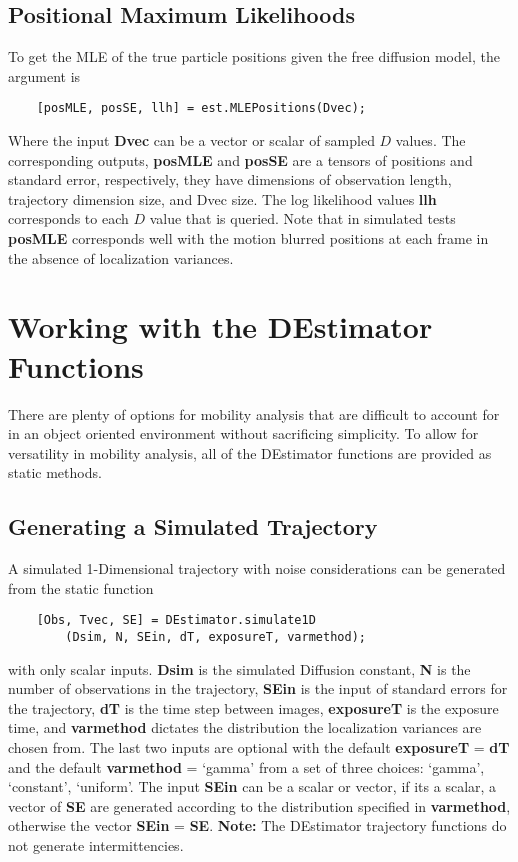 \documentclass{article}
\begin{document}
\subsection{Positional Maximum Likelihoods}
To get the MLE of the true particle positions given the free diffusion model, the argument is
\begin{verbatim}
    [posMLE, posSE, llh] = est.MLEPositions(Dvec);
\end{verbatim}
Where the input \textbf{Dvec} can be a vector or scalar of sampled $D$ values.  The corresponding outputs, \textbf{posMLE} and \textbf{posSE} are a tensors of positions and standard error, respectively, they have dimensions of observation length, trajectory dimension size, and Dvec size.  The log likelihood values \textbf{llh} corresponds to each $D$ value that is queried.  Note that in simulated tests \textbf{posMLE} corresponds well with the motion blurred positions at each frame in the absence of localization variances.

\section{Working with the DEstimator Functions}
There are plenty of options for mobility analysis that are difficult to account for in an object oriented environment without sacrificing simplicity. To allow for versatility in mobility analysis, all of the DEstimator functions are provided as static methods.

\subsection{Generating a Simulated Trajectory}
A simulated 1-Dimensional trajectory with noise considerations can be generated from the static function
\begin{verbatim}
    [Obs, Tvec, SE] = DEstimator.simulate1D
        (Dsim, N, SEin, dT, exposureT, varmethod);
\end{verbatim}
with only scalar inputs. \textbf{Dsim} is the simulated Diffusion constant, \textbf{N} is the number of observations in the trajectory, \textbf{SEin} is the input of standard errors for the trajectory, \textbf{dT} is the time step between images, \textbf{exposureT} is the exposure time, and \textbf{varmethod} dictates the distribution the localization variances are chosen from.  The last two inputs are optional with the default \textbf{exposureT} = \textbf{dT} and the default \textbf{varmethod} = `gamma' from a set of three choices: `gamma', `constant', `uniform'.  The input \textbf{SEin} can be a scalar or vector, if its a scalar, a vector of \textbf{SE} are generated according to the distribution specified in \textbf{varmethod}, otherwise the vector \textbf{SEin} = \textbf{SE}.
\textbf{Note:} The DEstimator trajectory functions do not generate intermittencies.
\end{document}
